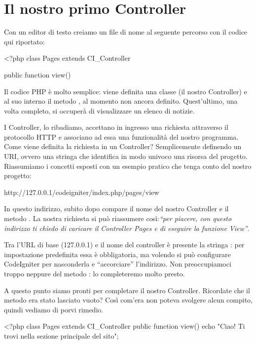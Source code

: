 \section*{Il nostro primo Controller}
Con un editor di testo creiamo un file di nome  al seguente percorso  con il codice qui riportato:

\begin{code}
<?php
class Pages extends CI_Controller {
	public function view()
	{

	}
}
\end{code}

Il codice \ac{PHP} è molto semplice: viene definita una classe  (il nostro Controller) e al suo interno il metodo , al momento non ancora definito. Quest'ultimo, una volta completo, si occuperà di visualizzare un elenco di notizie.

I Controller, lo ribadiamo, accettano in ingresso una richiesta attraverso il protocollo \ac{HTTP} e associano ad essa una funzionalità del nostro programma. Come viene definita la richiesta in un Controller? Semplicemente definendo un \ac{URI}, ovvero una stringa che identifica in modo univoco una risorsa del progetto. Riassumiamo i concetti esposti con un esempio pratico che tenga conto del nostro progetto:

\begin{code}
http://127.0.0.1/codeigniter/index.php/pages/view
\end{code}

In questo indirizzo, subito dopo  compare il nome del nostro Controller  e il metodo . La nostra richiesta si può riassumere così:\textit{``per piacere, con questo indirizzo ti chiedo di caricare il Controller Pages e di eseguire la funzione View''}. 

Tra l'\ac{URL} di base (127.0.0.1) e il nome del controller  è presente la stringa : per impostazione predefinita essa è obbligatoria, ma volendo si può configurare CodeIgniter per nasconderla e ``accorciare'' l'indirizzo. Non preoccupiamoci troppo neppure del metodo : lo completeremo molto presto.

A questo punto siamo pronti per completare il nostro Controller. Ricordate che il metodo  era stato lasciato vuoto? Così com'era non poteva svolgere alcun compito, quindi vediamo di porvi rimedio.

\begin{code}
<?php
class Pages extends CI_Controller {
	public function view()
	{
		echo "Ciao! Ti trovi nella sezione principale del sito";
	}
}
\end{code}

